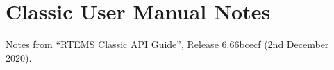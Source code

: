 \section{Classic User Manual Notes}

Notes from
``RTEMS Classic API Guide'',
Release 6.66bcecf (2nd December 2020).

\newpage
\newpage
\newpage
\newpage
\newpage
\newpage
\newpage
